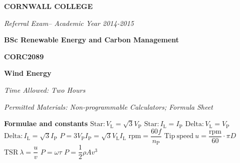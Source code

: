 \documentclass[a4paper,12pt,fleqn]{article}
\newcommand{\institution}{CORNWALL COLLEGE}
\newcommand{\titlehd}{BSc Renewable Energy and Carbon Management}
\newcommand{\examtype}{Referral Exam}
\newcommand{\examdate}{Academic Year 2014-2015}
\newcommand{\examcode}{CORC2089}
\newcommand{\examtitle}{Wind Energy}
\newcommand{\readtime}{15 Minutes}
\newcommand{\writetime}{Two Hours}
\newcommand{\materials}{Non-programmable Calculators; Formula Sheet}
\begin{document}

\begin{center}
\large\textbf{\institution}
\end{center}
\vspace{1cm}

\begin{center}
\textit{ \examtype -- \examdate}
\end{center}
\vspace{1cm}

\begin{center}
\large\textbf{\titlehd}
\end{center}

\begin{center}
\large\textbf{\examcode}
\end{center}
\begin{center}
\large\textbf{\examtitle}
\end{center}
\vspace{4cm}
\vspace{4cm}

\begin{center}
\end{center}
\begin{center}
\textit{Time Allowed:  \writetime}
\end{center}
\begin{center}
\textit{Permitted Materials: \materials}
\end{center}

\newpage
\textbf{Formulae and constants}
\newline\newline
$\mathrm{Star: }V_\mathrm{L}=\sqrt{3}V_\mathrm{P}$
\newline\newline
$\mathrm{Star: }I_\mathrm{L}=I_\mathrm{P}$
\newline\newline
$\mathrm{Delta: }V_\mathrm{L}=V_\mathrm{P}$
\newline\newline
$\mathrm{Delta: }I_\mathrm{L}=\sqrt{3}I_\mathrm{P}$
\newline\newline
$P=3V_\mathrm{P}I_\mathrm{P}=\sqrt{3}V_\mathrm{L}I_\mathrm{L}$
\newline\newline
$\mathrm{rpm}=\dfrac{60f}{n_\mathrm{P}}$
\newline\newline
$\mathrm{Tip\ speed\ }u=\dfrac{\mathrm{rpm}}{60}\cdot\pi D$
\newline\newline
$\mathrm{TSR\ }\lambda=\dfrac{u}{v}$
\newline\newline
$P=\omega\tau$
\newline\newline
$P=\dfrac{1}{2}\rho Av^3$
\end{document}
